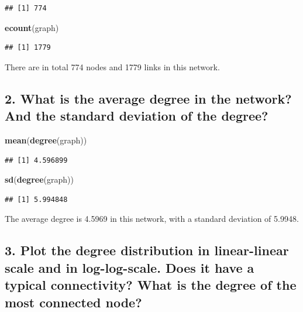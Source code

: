 \documentclass[
]{article}
\newenvironment{Shaded}{\begin{snugshade}}{\end{snugshade}}
\newcommand{\FunctionTok}[1]{\textcolor[rgb]{0.13,0.29,0.53}{\textbf{#1}}}
\newcommand{\NormalTok}[1]{#1}
\begin{document}
\begin{verbatim}
## [1] 774
\end{verbatim}

\begin{Shaded}
\begin{Highlighting}[]
\FunctionTok{ecount}\NormalTok{(graph)}
\end{Highlighting}
\end{Shaded}

\begin{verbatim}
## [1] 1779
\end{verbatim}

There are in total 774 nodes and 1779 links in this network.

\subsection{2. What is the average degree in the network? And the
standard deviation of the
degree?}\label{what-is-the-average-degree-in-the-network-and-the-standard-deviation-of-the-degree}

\begin{Shaded}
\begin{Highlighting}[]
\FunctionTok{mean}\NormalTok{(}\FunctionTok{degree}\NormalTok{(graph))}
\end{Highlighting}
\end{Shaded}

\begin{verbatim}
## [1] 4.596899
\end{verbatim}

\begin{Shaded}
\begin{Highlighting}[]
\FunctionTok{sd}\NormalTok{(}\FunctionTok{degree}\NormalTok{(graph))}
\end{Highlighting}
\end{Shaded}

\begin{verbatim}
## [1] 5.994848
\end{verbatim}

The average degree is 4.5969 in this network, with a standard deviation
of 5.9948.

\subsection{3. Plot the degree distribution in linear-linear scale and
in log-log-scale. Does it have a typical connectivity? What is the
degree of the most connected
node?}\label{plot-the-degree-distribution-in-linear-linear-scale-and-in-log-log-scale.-does-it-have-a-typical-connectivity-what-is-the-degree-of-the-most-connected-node}
\end{document}
